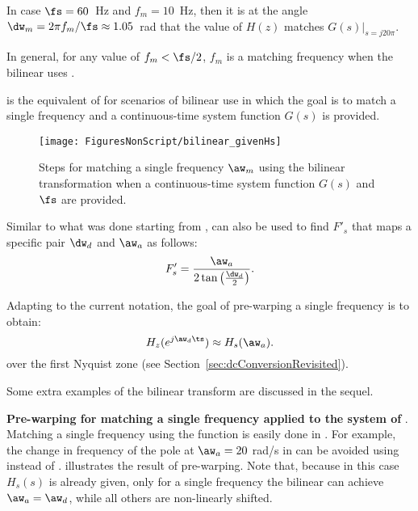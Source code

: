 In case $\fs=60$~Hz and $f_m = 10$~Hz, then it is at the angle $\dw_m=2\pi f_m/\fs \approx 1.05$~rad that the value of $H(z)$ matches $G(s)|_{s=j20\pi}$.

In general, for any value of $f_m < \fs/2$, $f_m$ is a matching frequency when the bilinear uses .
\eExample 

 is the equivalent of  for scenarios of bilinear use 
in which the goal is to match a single frequency and a continuous-time system function $G(s)$ is provided.

\begin{figure}
\centering
\texttt{[image: FiguresNonScript/bilinear\_givenHs]}
\caption{Steps for matching a single frequency $\aw_m$ using the bilinear transformation when a continuous-time system function $G(s)$ and $\fs$ are provided.\label{fig:bilinear_givenHs}}
\end{figure}


Similar to what was done starting from ,  can also be used to find $F'_s$ that maps a specific pair $\dw_d$ and $\aw_a$ as follows:
\begin{equation}
F'_s = \frac{\aw_a}{ 2\tan \left(  \frac{\dw_d}{2} \right) }.
\label{eq:bilinearPairWithMatchingViaFs}
\end{equation}

Adapting  to the current notation, the goal of pre-warping a single frequency
is to obtain:
\begin{equation}
H_z(e^{j \aw_d \ts}) \approx H_s(\aw_a).
\end{equation}
over the first Nyquist zone (see Section~\ref{sec:dcConversionRevisited}).

Some extra examples of the bilinear
transform are discussed in the sequel.

\bExample \textbf{Pre-warping for matching a single frequency applied to the system of }.
Matching a single frequency using the  function is easily done in {\matlab}. For example, the change in frequency of the pole at $\aw_a=20$ rad/s in  can be avoided using
 instead of .
 illustrates the result of pre-warping. Note that, because in this case $H_s(s)$ is already given, only for a single frequency the bilinear can achieve $\aw_a=\aw_d$, while all others are non-linearly shifted.

